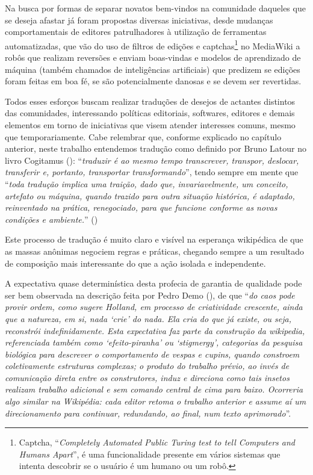 Na busca por formas de separar novatos bem-vindos na comunidade daqueles que se deseja afastar já foram propostas diversas iniciativas, desde mudanças comportamentais de editores patrulhadores à utilização de ferramentas automatizadas, que vão do uso de filtros de edições e captchas\footnote{Captcha, ``\textit{Completely Automated Public Turing test to tell Computers and Humans Apart}'', é uma funcionalidade presente em vários sistemas que intenta descobrir se o usuário é um humano ou um robô.} no MediaWiki a robôs que realizam reversões e enviam boas-vindas \citep{halfaker_bots_2012} e modelos de aprendizado de máquina (também chamados de inteligências artificiais) que predizem se edições foram feitas em boa fé, se são potencialmente danosas e se devem ser revertidas. \citep{halfaker_artificial_2015}

Todos esses esforços buscam realizar traduções de desejos de actantes distintos das comunidades, interessando políticas editoriais, softwares, editores e demais elementos em torno de iniciativas que visem atender interesses comuns, mesmo que temporariamente. Cabe relembrar que, conforme explicado no capítulo anterior, neste trabalho entendemos tradução como definido por Bruno Latour no livro Cogitamus (\citeyear[p.30]{latour_cogitamus_2010}): ``\textit{traduzir é ao mesmo tempo transcrever, transpor, deslocar, transferir e, portanto, transportar transformando}'', tendo sempre em mente que ``\textit{toda tradução implica uma traição, dado que, invariavelmente, um conceito, artefato ou máquina, quando trazido para outra situação histórica, é adaptado, reinventado na prática, renegociado, para que funcione conforme as novas condições e ambiente.}'' (\cite[p.27]{feitosa_cidadao_2010})

Este processo de tradução é muito claro e visível na esperança wikipédica de que as massas anônimas negociem regras e práticas, chegando sempre a um resultado de composição mais interessante do que a ação isolada e independente.

A expectativa quase determinística desta profecia de garantia de qualidade pode ser bem observada na descrição feita por Pedro Demo (\citeyear{demo_conhecimento_2009}), de que ``\textit{do caos pode provir ordem, como sugere Holland, em processo de criatividade crescente, ainda que a natureza, em si, nada ‘crie’ do nada. Ela cria do que já existe, ou seja, reconstrói indefinidamente. Esta expectativa faz parte da construção da wikipedia, referenciada também como ‘efeito-piranha’ ou ‘stigmergy’, categorias da pesquisa biológica para descrever o comportamento de vespas e cupins, quando constroem coletivamente estruturas complexas; o produto do trabalho prévio, ao invés de comunicação direta entre os construtores, induz e direciona como tais insetos realizam trabalho adicional e sem comando central de cima para baixo. Ocorreria algo similar na Wikipédia: cada editor retoma o trabalho anterior e assume aí um direcionamento para continuar, redundando, ao final, num texto aprimorado}''.


